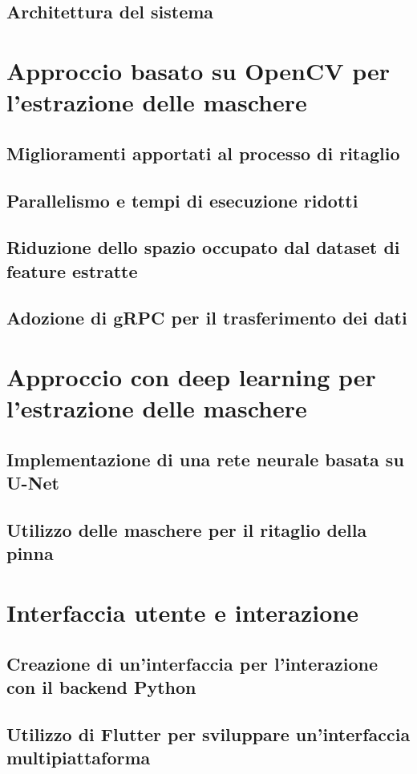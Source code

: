 \documentclass[a4paper,12pt]{report}
\begin{document}
    \subsection{Architettura del sistema}
    
  \section{Approccio basato su OpenCV per l'estrazione delle maschere}
    \subsection{Miglioramenti apportati al processo di ritaglio}
    \subsection{Parallelismo e tempi di esecuzione ridotti}
    \subsection{Riduzione dello spazio occupato dal dataset di feature estratte}
    \subsection{Adozione di gRPC per il trasferimento dei dati}
  \section{Approccio con deep learning per l'estrazione delle maschere}
    \subsection{Implementazione di una rete neurale basata su U-Net}
    \subsection{Utilizzo delle maschere per il ritaglio della pinna}
  \section{Interfaccia utente e interazione}
    \subsection{Creazione di un'interfaccia per l'interazione con il backend Python}
    \subsection{Utilizzo di Flutter per sviluppare un'interfaccia multipiattaforma}
\end{document}
